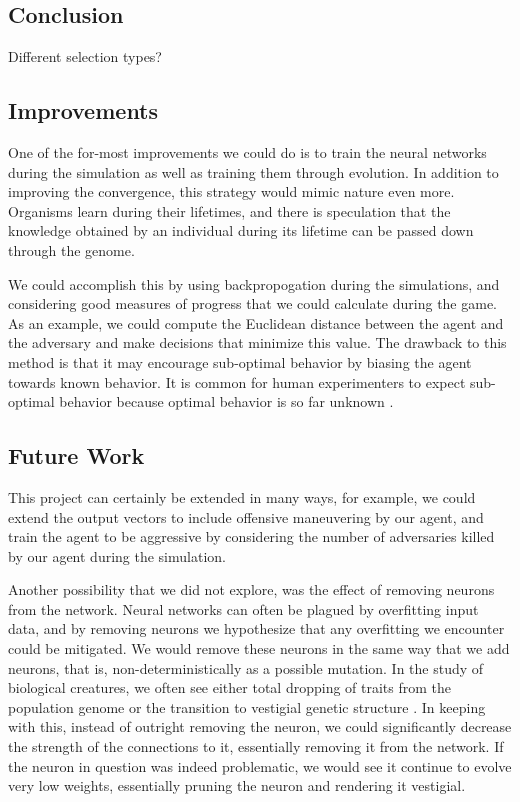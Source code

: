 \documentclass{article}
\begin{document}
\begin{multicols}{2}

\section{Conclusion}
Different selection types?
\blindtext

\subsection{Improvements}\label{sec:improvements}
One of the for-most improvements we could do is to train the neural networks
during the simulation as well as training them through evolution. In addition
to improving the convergence, this strategy would mimic nature even more.
Organisms learn during their lifetimes, and there is speculation that the knowledge obtained by an individual during its lifetime can be passed down through the
genome.

We could accomplish this by using backpropogation during the simulations, and considering good measures of progress that we could calculate during the game. As an example, we could compute the Euclidean distance between the agent and the adversary and make decisions that minimize this value. The drawback to this method is that it may encourage sub-optimal behavior by biasing the agent towards known behavior. It is common for human experimenters to expect sub-optimal behavior because optimal behavior is so far unknown \cite{lehman}.

\subsection{Future Work}
This project can certainly be extended in many ways, for example, we could
extend the output vectors to include offensive maneuvering by our agent, and
train the agent to be aggressive by considering the number of adversaries killed
by our agent during the simulation.

Another possibility that we did not explore, was the effect of removing neurons
from the network. Neural networks can often be plagued by overfitting input
data, and by removing neurons we hypothesize that any overfitting we encounter
could be mitigated. We would remove these neurons in the same way that we add
neurons, that is, non-deterministically as a possible mutation. In the study of
biological creatures, we often see either total dropping of traits from the
population genome or the transition to vestigial genetic structure
\cite{lehman}. In keeping with this, instead of outright removing the neuron, we
could significantly decrease the strength of the connections to it, essentially
removing it from the network. If the neuron in question was indeed problematic,
we would see it continue to evolve very low weights, essentially pruning the
neuron and rendering it vestigial.


\end{multicols}
\end{document}
